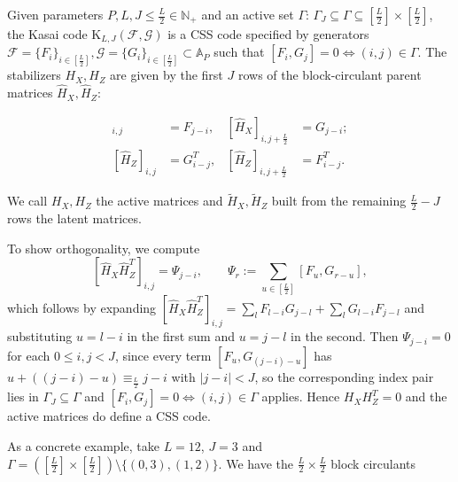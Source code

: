 \begin{definition}\label{def:kasai}
Given parameters $P, L, J \leq \frac{L}{2} \in \mathbb{N}_+$ and an active set $\Gamma:\, \Gamma_{J}\subseteq \Gamma \subseteq [\frac L2]\times [\frac L2]$, the Kasai code $\mathrm K_{L,J}(\mathcal F,\mathcal G)$ is a CSS code specified by generators $\mathcal F = \{F_i\}_{i\in[\frac L2]}, \mathcal{G} = \{G_i\}_{i\in[\frac L2]}\subset \mathbb A_P$ such that $[F_i, G_j] = 0 \iff (i,j)\in \Gamma$. The stabilizers $ H_X, {H}_Z$ are given by the first $J$ rows of the block-circulant parent matrices $\hat{H}_X, \hat{H}_Z$:

\begin{align*}
    [\hat H_X]_{i,j} &= F_{j-i},  &[\hat H_X]_{i,j+\frac L2 } &= G_{j-i}; \\
    [\hat H_Z]_{i,j} &= G^T_{i-j}, & [\hat H_Z]_{i,j+\frac L2 } &= F^T_{i-j}.
\end{align*}
\end{definition}

We call $H_X, H_Z$ the active matrices and $\tilde H_X, \tilde H_Z$ built from the remaining $\frac L2-J$ rows the latent matrices.

To show orthogonality, we compute
\begin{equation}\label{eq:psi-r}
    [\hat H_X\hat H_Z^T]_{i,j} = \Psi_{j-i},\qquad
    \Psi_{r} := \sum_{u\in[\frac L2]} [F_u, G_{r-u}],
\end{equation}
which follows by expanding $[\hat H_X\hat H_Z^T]_{i,j} = \sum_l F_{l-i}G_{j-l} + \sum_l G_{l-i}F_{j-l}$ and substituting $u = l-i$ in the first sum and $u = j-l$ in the second. Then $\Psi_{j-i} = 0$ for each $0\leq i,j<J$, since every term $[F_u, G_{(j-i)-u}]$ has $u + ((j-i)-u) \equiv_{\frac L2} j-i$ with $|j-i|<J$, so the corresponding index pair lies in $\Gamma_J\subseteq\Gamma$ and $[F_i,G_j] = 0\iff (i,j)\in\Gamma$ applies. Hence $H_XH_Z^T = 0$ and the active matrices do define a CSS code.

As a concrete example, take $L = 12$, $J = 3$ and $\Gamma  = \left([\frac L2]\times [\frac L2]\right)  \setminus \{(0,3), (1,2)\}$. We have the $\tfrac L2\times\tfrac L2$ block circulants

